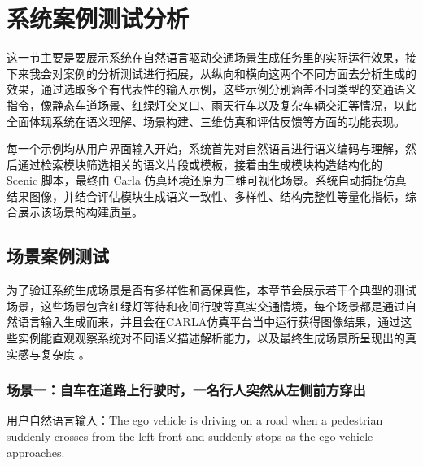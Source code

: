 \chapter{系统案例测试分析}

这一节主要是要展示系统在自然语言驱动交通场景生成任务里的实际运行效果，接下来我会对案例的分析测试进行拓展，从纵向和横向这两个不同方面去分析生成的效果，通过选取多个有代表性的输入示例，这些示例分别涵盖不同类型的交通语义指令，像静态车道场景、红绿灯交叉口、雨天行车以及复杂车辆交汇等情况，以此全面体现系统在语义理解、场景构建、三维仿真和评估反馈等方面的功能表现。

每一个示例均从用户界面输入开始，系统首先对自然语言进行语义编码与理解，然后通过检索模块筛选相关的语义片段或模板，接着由生成模块构造结构化的 Scenic 脚本，最终由 Carla 仿真环境还原为三维可视化场景。系统自动捕捉仿真结果图像，并结合评估模块生成语义一致性、多样性、结构完整性等量化指标，综合展示该场景的构建质量。
\section{场景案例测试}
为了验证系统生成场景是否有多样性和高保真性，本章节会展示若干个典型的测试场景，这些场景包含红绿灯等待和夜间行驶等真实交通情境，每个场景都是通过自然语言输入生成而来，并且会在CARLA仿真平台当中运行获得图像结果，通过这些实例能直观观察系统对不同语义描述解析能力，以及最终生成场景所呈现出的真实感与复杂度 。



\subsection{场景一：自车在道路上行驶时，一名行人突然从左侧前方穿出}
用户自然语言输入：The ego vehicle is driving on a road when a pedestrian suddenly crosses from the left front and suddenly stops as the ego vehicle approaches.

\vspace{1em}

